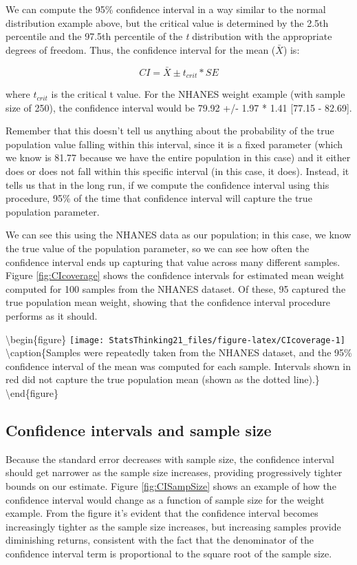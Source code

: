 \documentclass[12pt,]{book}
\theoremstyle{definition}
\theoremstyle{definition}
\theoremstyle{definition}
\theoremstyle{remark}
\begin{document}
We can compute the 95\% confidence interval in a way similar to the normal distribution example above, but the critical value is determined by the 2.5th percentile and the 97.5th percentile of the \emph{t} distribution with the appropriate degrees of freedom. Thus, the confidence interval for the mean (\(\bar{X}\)) is:

\[
CI = \bar{X} \pm t_{crit}*SE
\]

where \(t_{crit}\) is the critical t value.
For the NHANES weight example (with sample size of 250), the confidence interval would be 79.92 +/- 1.97 * 1.41 {[}77.15 - 82.69{]}.

Remember that this doesn't tell us anything about the probability of the true population value falling within this interval, since it is a fixed parameter (which we know is 81.77 because we have the entire population in this case) and it either does or does not fall within this specific interval (in this case, it does). Instead, it tells us that in the long run, if we compute the confidence interval using this procedure, 95\% of the time that confidence interval will capture the true population parameter.

We can see this using the NHANES data as our population; in this case, we know the true value of the population parameter, so we can see how often the confidence interval ends up capturing that value across many different samples. Figure \ref{fig:CIcoverage} shows the confidence intervals for estimated mean weight computed for 100 samples from the NHANES dataset. Of these, 95 captured the true population mean weight, showing that the confidence interval procedure performs as it should.

\textbackslash{}begin\{figure\}
\texttt{[image: StatsThinking21\_files/figure-latex/CIcoverage-1]} \textbackslash{}caption\{Samples were repeatedly taken from the NHANES dataset, and the 95\% confidence interval of the mean was computed for each sample. Intervals shown in red did not capture the true population mean (shown as the dotted line).\}\label{fig:CIcoverage}
\textbackslash{}end\{figure\}

\hypertarget{confidence-intervals-and-sample-size}{%
\subsection{Confidence intervals and sample size}\label{confidence-intervals-and-sample-size}}

Because the standard error decreases with sample size, the confidence interval should get narrower as the sample size increases, providing progressively tighter bounds on our estimate. Figure \ref{fig:CISampSize} shows an example of how the confidence interval would change as a function of sample size for the weight example. From the figure it's evident that the confidence interval becomes increasingly tighter as the sample size increases, but increasing samples provide diminishing returns, consistent with the fact that the denominator of the confidence interval term is proportional to the square root of the sample size.
\end{document}
